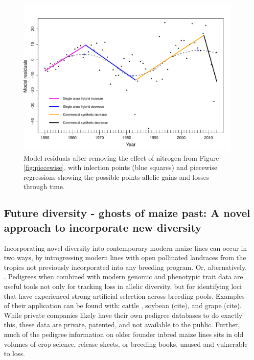 \documentclass[12pt]{article}
\begin{document}
\begin{figure}[ht]
\includegraphics[width=1.0\linewidth]{inflection_point.pdf}
\caption{Model residuals after removing the effect of nitrogen from Figure \ref{fig:piecewise}, with inlection points (blue squares) and piecewise regressions showing the possible points allelic gains and losses through time.} 
\label{fig:inflection}
\end{figure}

\subsection*{Future diversity - ghosts of maize past: A novel approach to incorporate new diversity}

Incorporating novel diversity into contemporary modern maize lines can occur in two ways, by introgressing modern lines with open pollinated landraces from the tropics not previously incorporated into any breeding program. Or, alternatively, 
%
%
. Pedigrees when combined with modern genomic and phenotypic trait data are useful tools not only for tracking loss in allelic diversity, but for identifying loci that have experienced strong artificial selection across breeding pools. Examples of their application can be found with: cattle \citep{Decker:2012kd}, soybean (cite), and grape (cite). 
While private companies likely have their own pedigree databases to do exactly this, these data are private, patented, and not available to the public. 
Further, much of the pedigree information on older founder inbred maize lines sits in old volumes of crop science, release sheets, or breeding books, unused and vulnerable to loss.
%
%
\end{document}

